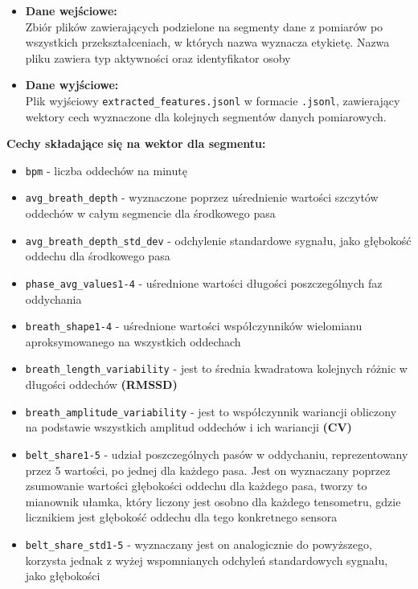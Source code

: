 \begin{itemize}
    \item \textbf{Dane wejściowe:} \\
    Zbiór plików zawierających podzielone na segmenty dane z pomiarów po 
    wszystkich przekształceniach, w których nazwa wyznacza etykietę. Nazwa pliku 
    zawiera typ aktywności oraz identyfikator osoby
    \item \textbf{Dane wyjściowe:} \\
    Plik wyjściowy
    \texttt{extracted\_features.jsonl}
    w formacie
    \texttt{.jsonl}, zawierający wektory 
    cech wyznaczone dla kolejnych segmentów danych pomiarowych. 
\end{itemize}

\noindent\textbf{Cechy składające się na wektor dla segmentu:}

\begin{itemize}
    \item \texttt{bpm} - liczba oddechów na minutę
    \item \texttt{avg\_breath\_depth} - wyznaczone poprzez uśrednienie wartości szczytów 
    oddechów w całym segmencie dla środkowego pasa
    \item \texttt{avg\_breath\_depth\_std\_dev} - odchylenie standardowe sygnału, jako głębokość 
    oddechu dla środkowego pasa
    \item \texttt{phase\_avg\_values1-4} - uśrednione wartości długości poszczególnych faz oddychania
    \item \texttt{breath\_shape1-4} - uśrednione wartości współczynników wielomianu aproksymowanego na wszystkich oddechach
    \item \texttt{breath\_length\_variability} - jest to średnia kwadratowa kolejnych różnic w długości oddechów \textbf{(RMSSD)}
    \item \texttt{breath\_amplitude\_variability} - jest to współczynnik wariancji obliczony na podstawie wszystkich amplitud oddechów i ich wariancji \textbf{(CV)}
    \item \texttt{belt\_share1-5} - udział poszczególnych pasów w oddychaniu, reprezentowany 
    przez 5 wartości, po jednej dla każdego pasa. Jest on wyznaczany poprzez 
    zsumowanie wartości głębokości oddechu dla każdego pasa, tworzy to mianownik 
    ułamka, który liczony jest osobno dla każdego tensometru, gdzie licznikiem jest 
    głębokość oddechu dla tego konkretnego sensora
    \item \texttt{belt\_share\_std1-5} - wyznaczany jest on analogicznie do powyższego, korzysta 
    jednak z wyżej wspomnianych odchyleń standardowych sygnału, jako głębokości
\end{itemize}


